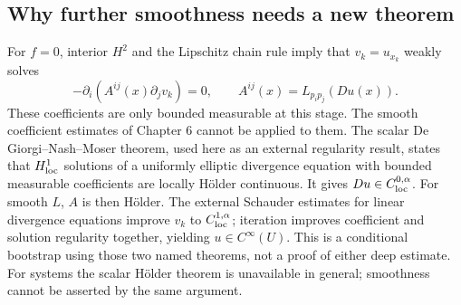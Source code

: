 \Needspace{45mm}
\subsection{Why further smoothness needs a new theorem}
For $f=0$, interior $H^2$ and the Lipschitz chain rule imply that
$v_k=u_{x_k}$ weakly solves
\[
 -\partial_i(A^{ij}(x)\partial_jv_k)=0,\qquad
 A^{ij}(x)=L_{p_ip_j}(Du(x)).
\]
These coefficients are only bounded measurable at this stage. The smooth
coefficient estimates of Chapter 6 cannot be applied to them.
The scalar De Giorgi--Nash--Moser theorem, used here as an external
regularity result, states that $H^1_{\rm loc}$ solutions of a uniformly
elliptic divergence equation with bounded measurable coefficients are
locally H\"older continuous. It gives $Du\in C^{0,\alpha}_{\rm loc}$.
For smooth $L$, $A$ is then H\"older. The external Schauder estimates
for linear divergence equations improve $v_k$ to $C^{1,\alpha}_{\rm loc}$;
iteration improves coefficient and solution regularity together, yielding
$u\in C^\infty(U)$.
This is a conditional bootstrap using those two named theorems, not a
proof of either deep estimate. For systems the scalar H\"older theorem
is unavailable in general; smoothness cannot be asserted by the same argument.
\Needspace{55mm}

